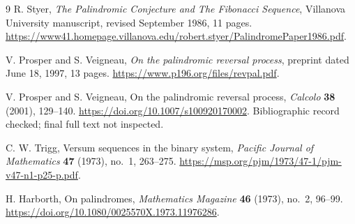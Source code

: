 \documentclass[11pt]{article}
\begin{document}
\begin{thebibliography}{9}
R. Styer, \emph{The Palindromic Conjecture and The Fibonacci Sequence},
Villanova University manuscript, revised September 1986, 11 pages.
\url{https://www41.homepage.villanova.edu/robert.styer/PalindromePaper1986.pdf}.

V. Prosper and S. Veigneau, \emph{On the palindromic reversal process},
preprint dated June 18, 1997, 13 pages.
\url{https://www.p196.org/files/revpal.pdf}.

V. Prosper and S. Veigneau, On the palindromic reversal process,
\emph{Calcolo} \textbf{38} (2001), 129--140.
\url{https://doi.org/10.1007/s100920170002}.
Bibliographic record checked; final full text not inspected.

C. W. Trigg, Versum sequences in the binary system,
\emph{Pacific Journal of Mathematics} \textbf{47} (1973), no.~1, 263--275.
\url{https://msp.org/pjm/1973/47-1/pjm-v47-n1-p25-p.pdf}.

H. Harborth, On palindromes,
\emph{Mathematics Magazine} \textbf{46} (1973), no.~2, 96--99.
\url{https://doi.org/10.1080/0025570X.1973.11976286}.
\end{thebibliography}
\end{document}
